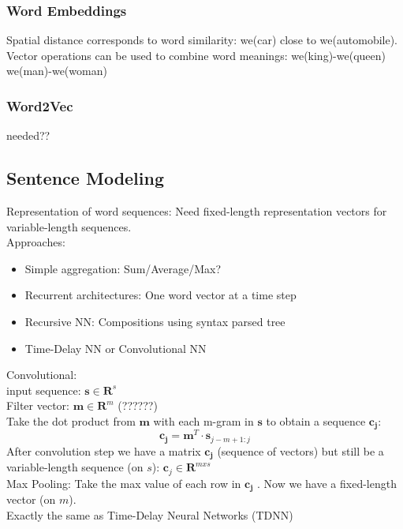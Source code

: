 \subsubsection{Word Embeddings}
\label{sssect:word-embeddings}
Spatial distance corresponds to word similarity: we(car) close to we(automobile).\\
Vector operations can be used to combine word meanings: we(king)-we(queen) ~ we(man)-we(woman)

\subsubsection{Word2Vec}
needed??

\subsection{Sentence Modeling}
\label{ssect:sentence-modeling}
Representation of word sequences: Need fixed-length representation vectors for variable-length sequences.\\
Approaches:
\begin{itemize}
	\item Simple aggregation: Sum/Average/Max?
	\item Recurrent architectures: One word vector at a time step
	\item Recursive NN: Compositions using syntax parsed tree
	\item Time-Delay NN or Convolutional NN
\end{itemize}
Convolutional:\\
input sequence: $\mathbf{s} \in \mathbf{R}^s$\\
Filter vector: $\mathbf{m} \in \mathbf{R}^m$ (??????)\\
Take the dot product from $\mathbf{m}$ with each m-gram in $\mathbf{s}$ to obtain a sequence $\mathbf{c_j}$:
\[
\mathbf{c_j} = \mathbf{m}^T \cdot \mathbf{s}_{j-m+1:j}
\]
After convolution step we have a matrix $\mathbf{c_j}$ (sequence of vectors) but still be a variable-length sequence (on $s$): $\mathbf{c}_j \in \mathbf{R}^{m x s}$\\
Max Pooling: Take the max value of each row in $\mathbf{c_j}$ . Now we have a fixed-length vector (on $m$).\\
Exactly the same as Time-Delay Neural Networks (TDNN)

